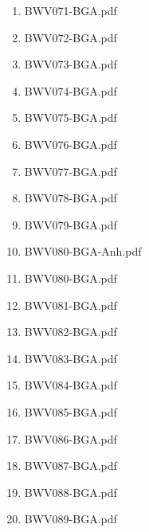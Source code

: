 \documentclass[11pt]{article}
\begin{document}
\begin{enumerate}
\begin{enumerate}
\begin{enumerate}
\item BWV071-BGA.pdf
\label{sec-1-1-1-1-44-6-7-1-82}

\item BWV072-BGA.pdf
\label{sec-1-1-1-1-44-6-7-1-83}

\item BWV073-BGA.pdf
\label{sec-1-1-1-1-44-6-7-1-84}

\item BWV074-BGA.pdf
\label{sec-1-1-1-1-44-6-7-1-85}

\item BWV075-BGA.pdf
\label{sec-1-1-1-1-44-6-7-1-86}

\item BWV076-BGA.pdf
\label{sec-1-1-1-1-44-6-7-1-87}

\item BWV077-BGA.pdf
\label{sec-1-1-1-1-44-6-7-1-88}

\item BWV078-BGA.pdf
\label{sec-1-1-1-1-44-6-7-1-89}

\item BWV079-BGA.pdf
\label{sec-1-1-1-1-44-6-7-1-90}

\item BWV080-BGA-Anh.pdf
\label{sec-1-1-1-1-44-6-7-1-91}

\item BWV080-BGA.pdf
\label{sec-1-1-1-1-44-6-7-1-92}

\item BWV081-BGA.pdf
\label{sec-1-1-1-1-44-6-7-1-93}

\item BWV082-BGA.pdf
\label{sec-1-1-1-1-44-6-7-1-94}

\item BWV083-BGA.pdf
\label{sec-1-1-1-1-44-6-7-1-95}

\item BWV084-BGA.pdf
\label{sec-1-1-1-1-44-6-7-1-96}

\item BWV085-BGA.pdf
\label{sec-1-1-1-1-44-6-7-1-97}

\item BWV086-BGA.pdf
\label{sec-1-1-1-1-44-6-7-1-98}

\item BWV087-BGA.pdf
\label{sec-1-1-1-1-44-6-7-1-99}

\item BWV088-BGA.pdf
\label{sec-1-1-1-1-44-6-7-1-100}

\item BWV089-BGA.pdf
\label{sec-1-1-1-1-44-6-7-1-101}


\end{enumerate}
\end{enumerate}
\end{enumerate}
\end{document}
